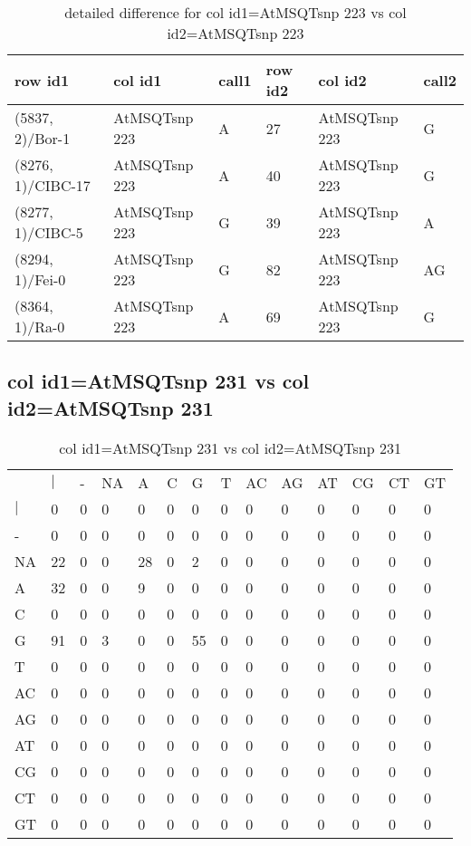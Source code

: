 \begin{center}
\begin{longtable}{|l|l|l|l|l|l|}
\caption{detailed difference for col id1=AtMSQTsnp 223 vs col id2=AtMSQTsnp 223} \label{table_dm587}\\
\hline
row id1&col id1&call1&row id2&col id2&call2\\
\hline
(5837, 2)/Bor-1&AtMSQTsnp 223&A&27&AtMSQTsnp 223&G\\
(8276, 1)/CIBC-17&AtMSQTsnp 223&A&40&AtMSQTsnp 223&G\\
(8277, 1)/CIBC-5&AtMSQTsnp 223&G&39&AtMSQTsnp 223&A\\
(8294, 1)/Fei-0&AtMSQTsnp 223&G&82&AtMSQTsnp 223&AG\\
(8364, 1)/Ra-0&AtMSQTsnp 223&A&69&AtMSQTsnp 223&G\\
\hline
\end{longtable}
\end{center}

\subsection{col id1=AtMSQTsnp 231 vs col id2=AtMSQTsnp 231}
\begin{center}
\begin{longtable}{|l|l|l|l|l|l|l|l|l|l|l|l|l|l|}
\caption{col id1=AtMSQTsnp 231 vs col id2=AtMSQTsnp 231} \label{table_dm588}\\
\hline
\\
\hline
&$|$&-&NA&A&C&G&T&AC&AG&AT&CG&CT&GT\\
$|$&0&0&0&0&0&0&0&0&0&0&0&0&0\\
-&0&0&0&0&0&0&0&0&0&0&0&0&0\\
NA&22&0&0&28&0&2&0&0&0&0&0&0&0\\
A&32&0&0&9&0&0&0&0&0&0&0&0&0\\
C&0&0&0&0&0&0&0&0&0&0&0&0&0\\
G&91&0&3&0&0&55&0&0&0&0&0&0&0\\
T&0&0&0&0&0&0&0&0&0&0&0&0&0\\
AC&0&0&0&0&0&0&0&0&0&0&0&0&0\\
AG&0&0&0&0&0&0&0&0&0&0&0&0&0\\
AT&0&0&0&0&0&0&0&0&0&0&0&0&0\\
CG&0&0&0&0&0&0&0&0&0&0&0&0&0\\
CT&0&0&0&0&0&0&0&0&0&0&0&0&0\\
GT&0&0&0&0&0&0&0&0&0&0&0&0&0\\
\hline
\end{longtable}
\end{center}

